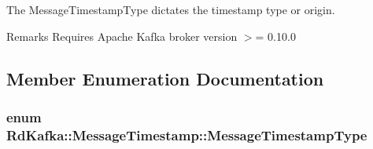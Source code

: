 The MessageTimestampType dictates the timestamp type or origin.

\begin{DoxyRemark}{Remarks}
Requires Apache Kafka broker version $>$= 0.10.0 
\end{DoxyRemark}


\subsection{Member Enumeration Documentation}
\hypertarget{classRdKafka_1_1MessageTimestamp_a92887c5e7e4e81475fa01c3b88deba6e}{
\subsubsection[{MessageTimestampType}]{\setlength{\rightskip}{0pt plus 5cm}enum {\bf RdKafka::MessageTimestamp::MessageTimestampType}}}
\label{classRdKafka_1_1MessageTimestamp_a92887c5e7e4e81475fa01c3b88deba6e}
